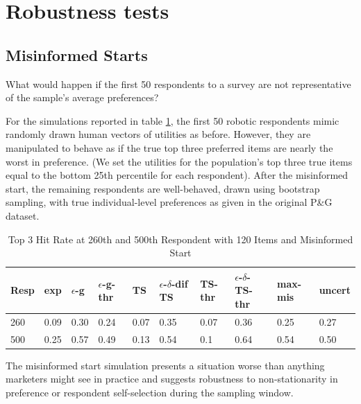 \documentclass[nonblindrev]{informs3}
\newcommand{\alexander}[1]{\textcolor{blue}{\textbf{(alexander)} #1}}
\newcommand{\eric}[1]{\textcolor{red}{\textbf{(eric)} #1}}
\newcommand{\fixedexpressS}{\textbf{exp}}
\newcommand{\egreedyS}{$\epsilon$-\textbf{g}}
\newcommand{\egreedythresS}{$\epsilon$-\textbf{g-thr}}
\newcommand{\misminS}{\textbf{max-mis}}
\newcommand{\tsS}{\textbf{TS} }
\newcommand{\edtsS}{$\epsilon$-$\delta$-\textbf{dif TS} }
\newcommand{\tsthresS}{\textbf{TS-thr} }
\newcommand{\edtsthresS}{$\epsilon$-$\delta$-\textbf{TS-thr} }
\newcommand{\uncertS}{\textbf{uncert} }
\begin{document}

\section{Robustness tests} \label{sec:robust}

\subsection{Misinformed Starts}


What would happen if the first 50 respondents to a survey are not representative of the sample's average preferences?

For the simulations reported in table \ref{table:120mis}, the first 50 robotic respondents mimic randomly drawn human vectors of utilities as before. However, they are manipulated to behave as if the true top three preferred items are nearly the worst in preference. (We set the utilities for the population's top three true items equal to the bottom 25th percentile for each respondent).  After the misinformed start, the remaining respondents are well-behaved, drawn using bootstrap sampling, with true individual-level preferences as given in the original P\&G dataset.

\begin{table}
\caption{Top 3 Hit Rate at 260th and 500th Respondent with 120 Items and Misinformed Start}
\begin{tabular}{llllllllll}
\hline   Resp &  \fixedexpressS&\egreedyS&\egreedythresS&\tsS&\edtsS&\tsthresS&\edtsthresS& \misminS& \uncertS   \\ \hline    260 &   0.09 &   0.30 & 0.24 & 0.07  & 0.35 & 0.07 &  0.36 & 0.25 &   0.27 \\
  500 &  0.25 &   0.57 &  0.49 &  0.13 & 0.54 &   0.1 &    0.64 & 0.54 &  0.50  \end{tabular}
\begin{center}
\label{table:120mis}
\end{center}
\end{table}

The misinformed start simulation presents a situation worse than anything marketers might see in practice and suggests robustness to non-stationarity in preference or respondent self-selection during the sampling window.
\end{document}
